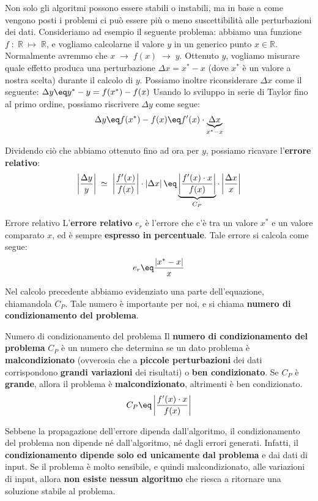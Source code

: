 Non solo gli algoritmi possono essere stabili o instabili, ma in base a come vengono posti i problemi ci può essere più o meno suscettibilità alle perturbazioni dei dati. Consideriamo ad esempio il seguente problema: abbiamo una funzione $f \; : \; \mathbb{R} \; \mapsto \; \mathbb{R}$, e vogliamo calcolarne il valore $y$ in un generico punto $x \in \mathbb{R}$. Normalmente avremmo che $x \; \rightarrow \; f(x) \; \rightarrow \; y$.
\nwl
Ottenuto $y$, vogliamo misurare quale effetto produca una perturbazione $\Delta x = x^* - x$ (dove $x^*$ è un valore a nostra scelta) durante il calcolo di $y$. Possiamo inoltre riconsiderare $\Delta x$ come il seguente: $\Delta y \eq y^* - y = f(x^*) - f(x)$
\nwl
Usando lo sviluppo in serie di Taylor fino al primo ordine, possiamo riscrivere $\Delta y$ come segue:
\[ \Delta y \eq f(x^*) - f(x) \eq f'(x) \cdot \underbrace{\Delta x}_{x^* - x} \]

Dividendo ciò che abbiamo ottenuto fino ad ora per $y$, possiamo ricavare l'\textbf{errore relativo}:
\[ \left| \frac{\Delta y}{y} \right| \; \simeq \; \left| \frac{f'(x)}{f(x)} \right| \cdot \left|\Delta x\right| \eq \underbrace{\left| \frac{f'(x) \cdot x}{f(x)} \right|}_{C_P} \cdot \left|\frac{\Delta x}{x}\right| \]

\begin{definition}{Errore relativo}
    L'\textbf{errore relativo} $e_r$ è l'errore che c'è tra un valore $x^*$ e un valore comparato $x$, ed è sempre \textbf{espresso in percentuale}. Tale errore si calcola come segue:
    \[ e_r \eq \frac{\left| x^* - x \right|}{x} \]
\end{definition}

Nel calcolo precedente abbiamo evidenziato una parte dell'equazione, chiamandola $C_P$. Tale numero è importante per noi, e si chiama \textbf{numero di condizionamento del problema}.

\begin{definition}{Numero di condizionamento del problema}
    Il \textbf{numero di condizionamento del problema} $C_P$ è un numero che determina se un dato problema è \textbf{malcondizionato} (ovverosia che a \textbf{piccole perturbazioni} dei dati corrispondono \textbf{grandi variazioni} dei risultati) o \textbf{ben condizionato}. Se $C_P$ è \textbf{grande}, allora il problema è \textbf{malcondizionato}, altrimenti è ben condizionato.
    \[ C_P \eq \left| \frac{f'(x) \cdot x}{f(x)} \right| \]
\end{definition}

Sebbene la propagazione dell'errore dipenda dall'algoritmo, il condizionamento del problema non dipende né dall'algoritmo, né dagli errori generati. Infatti, il \textbf{condizionamento dipende solo ed unicamente dal problema} e dai dati di input. Se il problema è molto sensibile, e quindi malcondizionato, alle variazioni di input, allora \textbf{non esiste nessun algoritmo} che riesca a ritornare una soluzione stabile al problema.
